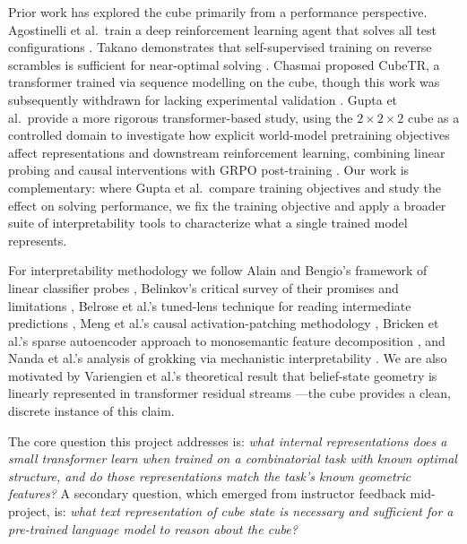 \documentclass[12pt]{article}
\begin{document}
Prior work has explored the cube primarily from a performance perspective.
Agostinelli et al.\ train a deep reinforcement learning agent that solves all
test configurations \cite{agostinelli2019deepcubea}.  Takano demonstrates that
self-supervised training on reverse scrambles is sufficient for near-optimal
solving \cite{takano2021selfsupervision}.  Chasmai proposed CubeTR, a transformer trained via sequence modelling on the
cube, though this work was subsequently withdrawn for lacking experimental
validation \cite{chasmai2021cubetr}.  Gupta et al.\ provide a more rigorous
transformer-based study, using the $2{\times}2{\times}2$ cube as a controlled
domain to investigate how explicit world-model pretraining objectives affect
representations and downstream reinforcement learning, combining linear probing
and causal interventions with GRPO post-training
\cite{gupta2024worldmodels}.  Our work is complementary: where Gupta et al.\
compare training objectives and study the effect on solving performance, we fix
the training objective and apply a broader suite of interpretability tools to
characterize what a single trained model represents.

For interpretability methodology we follow Alain and Bengio's framework of
linear classifier probes \cite{alain2016probes}, Belinkov's critical survey of
their promises and limitations \cite{belinkov2022probing}, Belrose et al.'s
tuned-lens technique for reading intermediate predictions \cite{belrose2023tunedlens},
Meng et al.'s causal activation-patching methodology
\cite{meng2022locatingfactual}, Bricken et al.'s sparse autoencoder approach
to monosemantic feature decomposition \cite{bricken2023monosemantic}, and
Nanda et al.'s analysis of grokking via mechanistic interpretability
\cite{nanda2023grokking}.  We are also motivated by Variengien et al.'s
theoretical result that belief-state geometry is linearly represented in
transformer residual streams \cite{variengien2024beliefstate}---the cube
provides a clean, discrete instance of this claim.

The core question this project addresses is: \emph{what internal representations
does a small transformer learn when trained on a combinatorial task with known
optimal structure, and do those representations match the task's known
geometric features?}  A secondary question, which emerged from instructor
feedback mid-project, is: \emph{what text representation of cube state is
necessary and sufficient for a pre-trained language model to reason about the
cube?}

\end{document}
